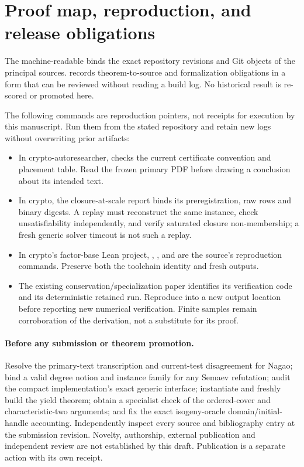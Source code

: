 \section{Proof map, reproduction, and release obligations}

The machine-readable  binds the exact repository
revisions and Git objects of the principal sources. 
records theorem-to-source and formalization obligations in a form that
can be reviewed without reading a build log. No historical result is
re-scored or promoted here.

The following commands are reproduction pointers, not receipts for
execution by this manuscript. Run them from the stated repository and
retain new logs without overwriting prior artifacts:
\begin{itemize}
\item In crypto-autoresearcher,
checks the current certificate convention and placement table. Read the
frozen primary PDF before drawing a conclusion about its intended text.
\item In crypto, the closure-at-scale report binds its preregistration,
raw rows and binary digests. A replay must reconstruct the same instance,
check unsatisfiability independently, and verify saturated closure
non-membership; a fresh generic solver timeout is not such a replay.
\item In crypto's factor-base Lean project,
, , and
are the source's reproduction commands. Preserve both the toolchain
identity and fresh outputs.
\item The existing conservation/specialization paper identifies its
 verification code and its deterministic retained
run. Reproduce into a new output location before reporting new numerical
verification. Finite samples remain corroboration of the derivation,
not a substitute for its proof.
\end{itemize}

\paragraph{Before any submission or theorem promotion.}
Resolve the primary-text transcription and current-test disagreement
for Nagao; bind a valid degree notion and instance family for any
Semaev refutation; audit the compact implementation's exact generic
interface; instantiate and freshly build the yield theorem; obtain a
specialist check of the ordered-cover and characteristic-two arguments;
and fix the exact isogeny-oracle domain/initial-handle accounting.
Independently inspect every source and bibliography entry at the
submission revision. Novelty, authorship, external publication and
independent review are not established by this draft. Publication is a
separate action with its own receipt.

